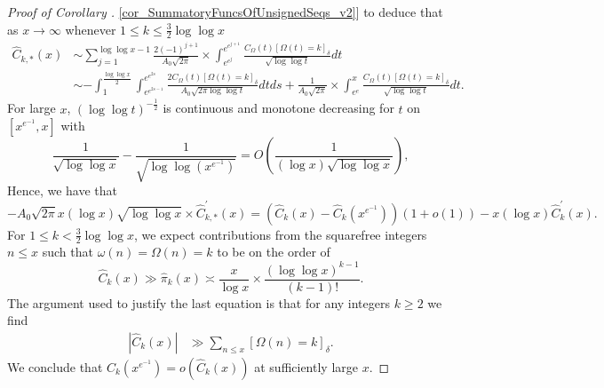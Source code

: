 \documentclass[11pt,reqno,a4letter]{article}
\newcommand{\hlocalref}[1]{\hyperref[#1]{\ref{#1}}}
\numberwithin{equation}{section}
\numberwithin{figure}{section}
\numberwithin{table}{section}
\newcommand{\Iverson}[1]{\ensuremath{\left[#1\right]_{\delta}}}
\theoremstyle{plain}
\numberwithin{theorem}{section}
\theoremstyle{definition}
\begin{document}
\begin{proof}[Proof of Corollary \hlocalref{cor_SummatoryFuncsOfUnsignedSeqs_v2}]
to deduce that as $x \rightarrow \infty$ whenever $1 \leq k \leq \frac{3}{2} \log\log x$ 
\begin{align*} 
     \widehat{C}_{k,\ast}(x) & \sim 
     \sum_{j=1}^{\log\log x-1} \frac{2 (-1)^{j+1}}{A_0\sqrt{2\pi}} \times \int_{e^{e^j}}^{e^{e^{j+1}}} 
     \frac{C_{\Omega}(t) \Iverson{\Omega(t) = k}}{\sqrt{\log\log t}} dt \\ 
     & \sim -\int_1^{\frac{\log\log x}{2}} \int_{e^{e^{2s-1}}}^{e^{e^{2s}}} 
     \frac{2 C_{\Omega}(t) \Iverson{\Omega(t) = k}}{A_0 \sqrt{2\pi \log\log t}} dt ds +
     \frac{1}{A_0 \sqrt{2\pi}} \times \int_{e^e}^x 
     \frac{C_{\Omega}(t) \Iverson{\Omega(t) = k}}{\sqrt{\log\log t}} dt. 
\end{align*} 
For large $x$, $(\log\log t)^{-\frac{1}{2}}$ is continuous and monotone decreasing for $t$ on 
$\left[x^{e^{-1}}, x\right]$ with 
\[
\frac{1}{\sqrt{\log\log x}} - \frac{1}{\sqrt{\log\log\left(x^{e^{-1}}\right)}} = 
     O\left(\frac{1}{(\log x) \sqrt{\log\log x}}\right), 
\]
Hence, we have that 
\begin{equation} 
\label{eqn_ProofTag_HatCkx_Asymptotics_v1_v0}
     -A_0 \sqrt{2\pi} x (\log x) \sqrt{\log\log x} \times \widehat{C}_{k,\ast}^{\prime}(x) = 
     \left(\widehat{C}_k(x) - \widehat{C}_k\left(x^{e^{-1}}\right)\right)(1+o(1)) - 
     x (\log x) \widehat{C}_k^{\prime}(x). 
\end{equation} 
For $1 \leq k < \frac{3}{2} \log\log x$, we expect contributions from the squarefree integers $n \leq x$ 
such that $\omega(n) = \Omega(n) = k$ to be on the order of 
\[
\widehat{C}_k(x) \gg \widehat{\pi}_k(x) \asymp 
     \frac{x}{\log x} \times \frac{(\log\log x)^{k-1}}{(k-1)!}. 
\]
The argument used to justify the last equation is that for any integers $k \geq 2$ we find 
\begin{align*}
\left\lvert \widehat{C}_k(x) \right\rvert & \gg 
     \sum_{n \leq x} \Iverson{\Omega(n) = k}. 
\end{align*}
We conclude that 
$\widehat{C}_k\left(x^{e^{-1}}\right) = o\left(\widehat{C}_k(x)\right)$ at sufficiently large $x$. 


\end{proof}
\end{document}
